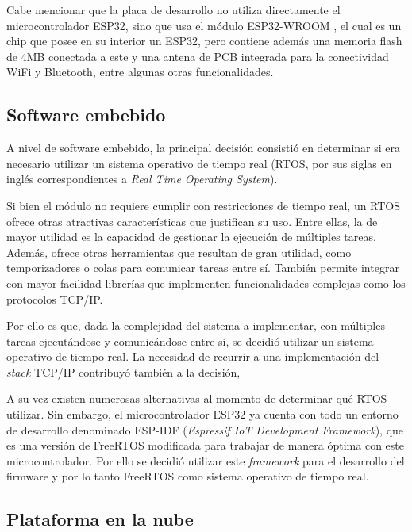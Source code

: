 
Cabe mencionar que la placa de desarrollo no utiliza directamente el microcontrolador ESP32, sino que usa el módulo ESP32-WROOM \citep{esp32_wroom}, el cual es un chip que posee en su interior un ESP32, pero contiene además una memoria flash de 4MB conectada a este y una antena de PCB integrada para la conectividad WiFi y Bluetooth, entre algunas otras funcionalidades.

\subsection{Software embebido}

A nivel de software embebido, la principal decisión consistió en determinar si era necesario utilizar un sistema operativo de tiempo real (RTOS, por sus siglas en inglés correspondientes a \emph{Real Time Operating System}).

Si bien el módulo no requiere cumplir con restricciones de tiempo real, un RTOS ofrece otras atractivas características que justifican su uso. Entre ellas, la de mayor utilidad es la capacidad de gestionar la ejecución de múltiples tareas. Además, ofrece otras herramientas que resultan de gran utilidad, como temporizadores o colas para comunicar tareas entre sí. También permite integrar con mayor facilidad librerías que implementen funcionalidades complejas como los protocolos TCP/IP.

Por ello es que, dada la complejidad del sistema a implementar, con múltiples tareas ejecutándose y comunicándose entre sí, se decidió utilizar un sistema operativo de tiempo real. La necesidad de recurrir a una implementación del \emph{stack} TCP/IP contribuyó también a la decisión, 

A su vez existen numerosas alternativas al momento de determinar qué RTOS utilizar. Sin embargo, el microcontrolador ESP32 ya cuenta con todo un entorno de desarrollo denominado ESP-IDF (\emph{Espressif IoT Development Framework}), que es una versión de FreeRTOS \citep{freertos} modificada para trabajar de manera óptima con este microcontrolador. Por ello se decidió utilizar este \emph{framework} para el desarrollo del firmware y por lo tanto FreeRTOS como sistema operativo de tiempo real.

\subsection{Plataforma en la nube}
\label{plataforma_nube}

